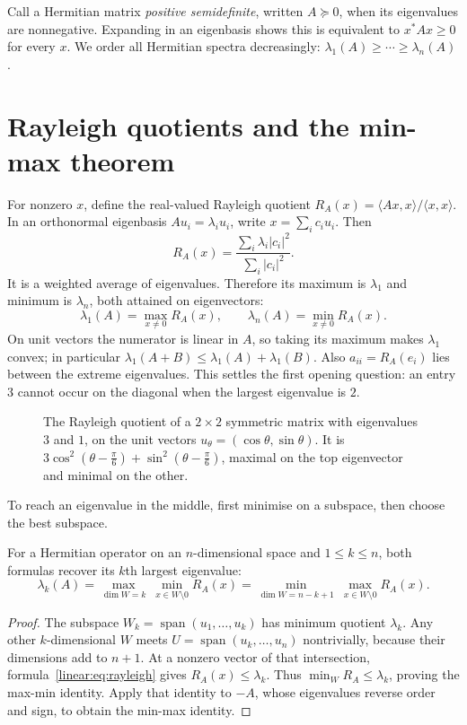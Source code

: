 Call a Hermitian matrix \emph{positive semidefinite}, written $A\succeq0$, when its eigenvalues are nonnegative. Expanding in an eigenbasis shows this is equivalent to $x^*Ax\ge0$ for every $x$. We order all Hermitian spectra decreasingly: $\lambda_1(A)\ge\cdots\ge\lambda_n(A)$.

\section{Rayleigh quotients and the min-max theorem}

For nonzero $x$, define the real-valued Rayleigh quotient $R_A(x)=\langle Ax,x\rangle/\langle x,x\rangle$. In an orthonormal eigenbasis $Au_i=\lambda_iu_i$, write $x=\sum_ic_iu_i$. Then
\begin{equation}\label{linear:eq:rayleigh}
R_A(x)=\frac{\sum_i\lambda_i|c_i|^2}{\sum_i|c_i|^2}.
\end{equation}
It is a weighted average of eigenvalues. Therefore its maximum is $\lambda_1$ and minimum is $\lambda_n$, both attained on eigenvectors:
\[\lambda_1(A)=\max_{x\ne0}R_A(x),\qquad\lambda_n(A)=\min_{x\ne0}R_A(x).\]
On unit vectors the numerator is linear in $A$, so taking its maximum makes $\lambda_1$ convex; in particular $\lambda_1(A+B)\le\lambda_1(A)+\lambda_1(B)$. Also $a_{ii}=R_A(e_i)$ lies between the extreme eigenvalues. This settles the first opening question: an entry $3$ cannot occur on the diagonal when the largest eigenvalue is $2$.

\begin{figure}[ht]
\centering
{}
\caption{The Rayleigh quotient of a $2\times2$ symmetric matrix with eigenvalues $3$ and $1$, on the unit vectors
$u_\theta=(\cos\theta,\sin\theta)$. It is $3\cos^2(\theta-\frac\pi6)+\sin^2(\theta-\frac\pi6)$, maximal on the top eigenvector
and minimal on the other.}
\label{linear:fig:rayleigh}
\end{figure}

To reach an eigenvalue in the middle, first minimise on a subspace, then choose the best subspace.

\begin{theorem}\label{linear:thm:courantfischer}
For a Hermitian operator on an $n$-dimensional space and $1\le k\le n$, both formulas recover its $k$th largest eigenvalue:
\[\lambda_k(A)=\max_{\dim W=k}\ \min_{x\in W\setminus0}R_A(x)=\min_{\dim W=n-k+1}\ \max_{x\in W\setminus0}R_A(x).\]
\end{theorem}
\begin{proof}
The subspace $W_k=\operatorname{span}(u_1,\dots,u_k)$ has minimum quotient $\lambda_k$. Any other $k$-dimensional $W$ meets $U=\operatorname{span}(u_k,\dots,u_n)$ nontrivially, because their dimensions add to $n+1$. At a nonzero vector of that intersection, formula~\eqref{linear:eq:rayleigh} gives $R_A(x)\le\lambda_k$. Thus $\min_WR_A\le\lambda_k$, proving the max-min identity. Apply that identity to $-A$, whose eigenvalues reverse order and sign, to obtain the min-max identity.
\end{proof}

